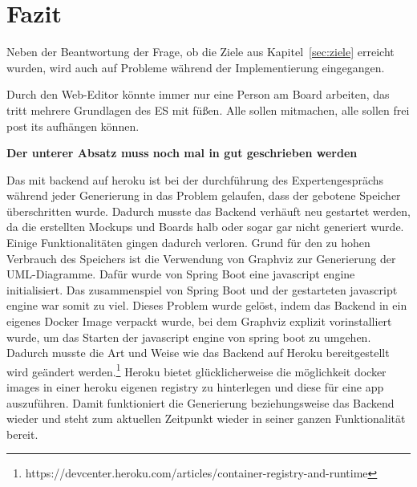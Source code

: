 \chapter{Fazit}\label{ch:fazit}
Neben der Beantwortung der Frage, ob die Ziele aus Kapitel~\ref{sec:ziele} erreicht wurden, wird auch auf Probleme während
der Implementierung eingegangen.





Durch den Web-Editor könnte immer nur eine Person am Board arbeiten, das tritt mehrere Grundlagen des ES mit füßen.
Alle sollen mitmachen, alle sollen frei post its aufhängen können.



\textbf{Der unterer Absatz muss noch mal in gut geschrieben werden}

Das mit backend auf heroku ist bei der durchführung des Expertengesprächs während jeder Generierung in das Problem gelaufen,
dass der gebotene Speicher überschritten wurde.
Dadurch musste das Backend verhäuft neu gestartet werden, da die erstellten Mockups und Boards halb oder sogar gar nicht generiert wurde.
Einige Funktionalitäten gingen dadurch verloren.
Grund für den zu hohen Verbrauch des Speichers ist die Verwendung von Graphviz zur Generierung der UML-Diagramme.
Dafür wurde von Spring Boot eine javascript engine initialisiert.
Das zusammenspiel von Spring Boot und der gestarteten javascript engine war somit zu viel.
Dieses Problem wurde gelöst, indem das Backend in ein eigenes Docker Image verpackt wurde, bei dem Graphviz explizit vorinstalliert wurde,
um das Starten der javascript engine von spring boot zu umgehen.
Dadurch musste die Art und Weise wie das Backend auf Heroku bereitgestellt wird geändert werden.\footnote{https://devcenter.heroku.com/articles/container-registry-and-runtime}
Heroku bietet glücklicherweise die möglichkeit docker images in einer heroku eigenen registry zu hinterlegen und diese für eine app auszuführen.
Damit funktioniert die Generierung beziehungsweise das Backend wieder und steht zum aktuellen Zeitpunkt wieder in seiner ganzen Funktionalität bereit.
